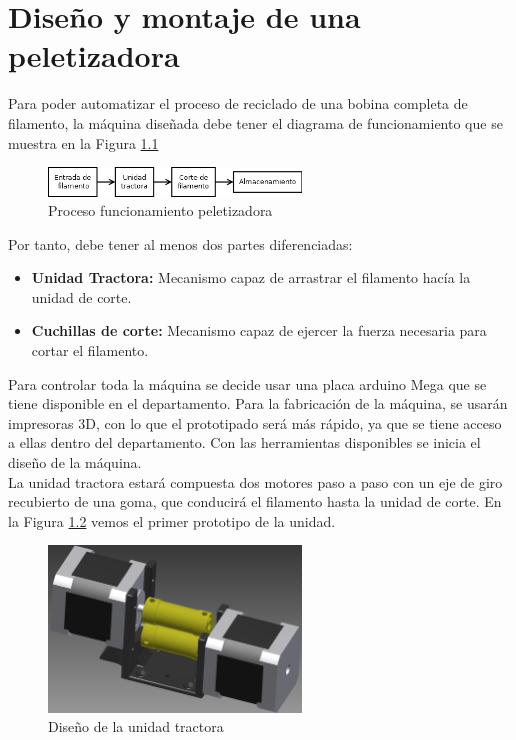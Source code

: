 
\chapter{Diseño y montaje de una peletizadora}
\label{ane:peletizadora}

Para poder automatizar el proceso de reciclado de una bobina completa de filamento, la máquina diseñada debe tener el diagrama de funcionamiento que se muestra en la Figura \ref{fig:peletizadora_diagram2}

\begin{figure}[H]
    \centering
    \includegraphics[width=0.6\textwidth]{images/peletizadora/Diagram2.png}
    \caption{Proceso funcionamiento peletizadora}
    \label{fig:peletizadora_diagram2}
\end{figure}

Por tanto, debe tener al menos dos partes diferenciadas:

\begin{itemize}
	\item{\textbf{Unidad Tractora:} Mecanismo capaz de arrastrar el filamento hacía la unidad de corte.}
	\item{\textbf{Cuchillas de corte:} Mecanismo capaz de ejercer la fuerza necesaria para cortar el filamento.}
\end{itemize}

Para controlar toda la máquina se decide usar una placa arduino Mega que se tiene disponible en el departamento. Para la fabricación de la máquina, se usarán impresoras 3D, con lo que el prototipado será más rápido, ya que se tiene acceso a ellas dentro del departamento. Con las herramientas disponibles se inicia el diseño de la máquina.\\

La unidad tractora estará compuesta dos motores paso a paso con un eje de giro recubierto de una goma, que conducirá el filamento hasta la unidad de corte. En la Figura \ref{fig:peletizadora_tractora} vemos el primer prototipo de la unidad.

\begin{figure}[H]
    \centering
    \includegraphics[width=0.6\textwidth]{images/peletizadora/unidadtractora.png}
    \caption{Diseño de la unidad tractora}
    \label{fig:peletizadora_tractora}
\end{figure}

